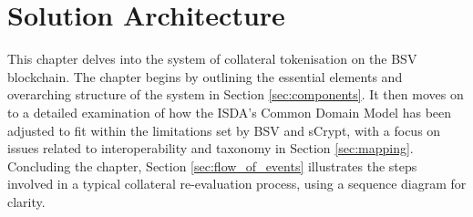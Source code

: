 \chapter{Solution Architecture}
\label{ch:solutionArchitecture}
This chapter delves into the system of collateral tokenisation on the BSV blockchain. The chapter begins by outlining the essential elements and overarching structure of the system in Section \ref{sec:components}. It then moves on to a detailed examination of how the ISDA's Common Domain Model has been adjusted to fit within the limitations set by BSV and sCrypt, with a focus on issues related to interoperability and taxonomy in Section \ref{sec:mapping}. Concluding the chapter, Section \ref{sec:flow_of_events} illustrates the steps involved in a typical collateral re-evaluation process, using a sequence diagram for clarity. 
